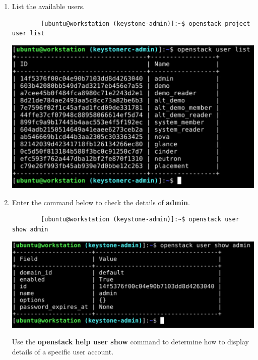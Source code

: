 \documentclass[letterpaper, 12pt]{article}
\begin{document}
\begin{enumerate}
    \item List the available users.
    \begin{lstlisting}
        [ubuntu@workstation (keystone-admin)]:~$ openstack project user list
    \end{lstlisting}

    \begin{center}
        \includegraphics[width=\linewidth]{images/part2/step7.png}
    \end{center}

    \item Enter the command below to check the details of \textbf{admin}.
    \begin{lstlisting}
        [ubuntu@workstation (keystone-admin)]:~$ openstack user show admin
    \end{lstlisting}

    \begin{center}
        \includegraphics[width=\linewidth]{images/part2/step8.png}
    \end{center}

    \begin{tipbox}
        Use the \textbf{openstack help user show} command to determine how to display details of a specific user
        account.
    \end{tipbox}


\end{enumerate}
\end{document}
